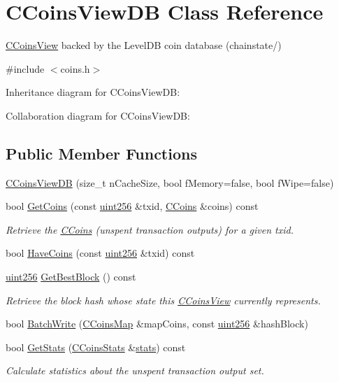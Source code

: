 \hypertarget{class_c_coins_view_d_b}{}\section{C\+Coins\+View\+D\+B Class Reference}
\label{class_c_coins_view_d_b}


\hyperlink{class_c_coins_view}{C\+Coins\+View} backed by the Level\+D\+B coin database (chainstate/)  




{\ttfamily \#include $<$coins.\+h$>$}



Inheritance diagram for C\+Coins\+View\+D\+B\+:


Collaboration diagram for C\+Coins\+View\+D\+B\+:
\subsection*{Public Member Functions}
\begin{DoxyCompactItemize}
\item 
\hyperlink{class_c_coins_view_d_b_a209841b241febcccb2ec584b886ad374}{C\+Coins\+View\+D\+B} (size\+\_\+t n\+Cache\+Size, bool f\+Memory=false, bool f\+Wipe=false)
\item 
bool \hyperlink{class_c_coins_view_d_b_a20655c9c13a6124cdcf210206d518d92}{Get\+Coins} (const \hyperlink{classuint256}{uint256} \&txid, \hyperlink{class_c_coins}{C\+Coins} \&coins) const 
\begin{DoxyCompactList}\small\item\em Retrieve the \hyperlink{class_c_coins}{C\+Coins} (unspent transaction outputs) for a given txid. \end{DoxyCompactList}\item 
bool \hyperlink{class_c_coins_view_d_b_a4d08cf2d3440c1de4e48cfddd67962d7}{Have\+Coins} (const \hyperlink{classuint256}{uint256} \&txid) const 
\item 
\hyperlink{classuint256}{uint256} \hyperlink{class_c_coins_view_d_b_a01777676c2eafd2970a9d53e5fb4a49a}{Get\+Best\+Block} () const 
\begin{DoxyCompactList}\small\item\em Retrieve the block hash whose state this \hyperlink{class_c_coins_view}{C\+Coins\+View} currently represents. \end{DoxyCompactList}\item 
bool \hyperlink{class_c_coins_view_d_b_a33f98ec9323ce48e1704327bc8a2a002}{Batch\+Write} (\hyperlink{coins_8h_a2886ba2fd0428bae777e1cbcabc02834}{C\+Coins\+Map} \&map\+Coins, const \hyperlink{classuint256}{uint256} \&hash\+Block)
\item 
bool \hyperlink{class_c_coins_view_d_b_a6bbe15962b0efd519e30dada872f01c5}{Get\+Stats} (\hyperlink{struct_c_coins_stats}{C\+Coins\+Stats} \&\hyperlink{db__bench_8cc_a5925d216740c89f43482df806fd14e8c}{stats}) const 
\begin{DoxyCompactList}\small\item\em Calculate statistics about the unspent transaction output set. \end{DoxyCompactList}\end{DoxyCompactItemize}
